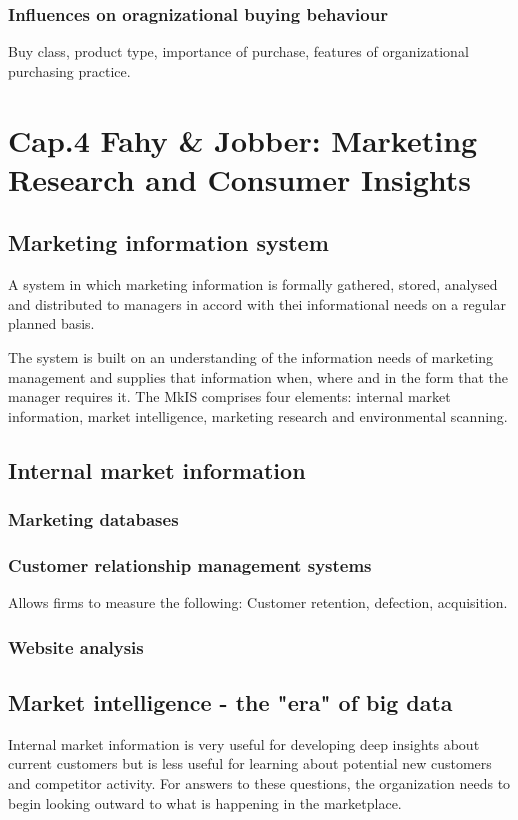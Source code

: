 \documentclass{article}
\begin{document}
\subsubsection*{Influences on oragnizational buying behaviour}
Buy class, product type, importance of purchase, features of organizational purchasing practice.

\section{Cap.4 Fahy \& Jobber: Marketing Research and Consumer Insights}

\subsection{Marketing information system}
A system in which marketing information is formally gathered, stored, analysed and distributed to managers in accord with thei informational needs on a regular planned basis.

The system is built on an understanding of the information needs of marketing management and supplies that information when, where and in the form that the manager requires it. The MkIS comprises four elements: internal market information, market intelligence, marketing research and environmental scanning. 

\subsection{Internal market information}
\subsubsection*{Marketing databases}
\subsubsection*{Customer relationship management systems}
Allows firms to measure the following: Customer retention, defection, acquisition.
\subsubsection*{Website analysis}

\subsection{Market intelligence - the "era" of big data}
Internal market information is very useful for developing deep insights about current customers but is less useful for learning about potential new customers and competitor activity. For answers to these questions, the organization needs to begin looking outward to what is happening in the marketplace. 
\end{document}
